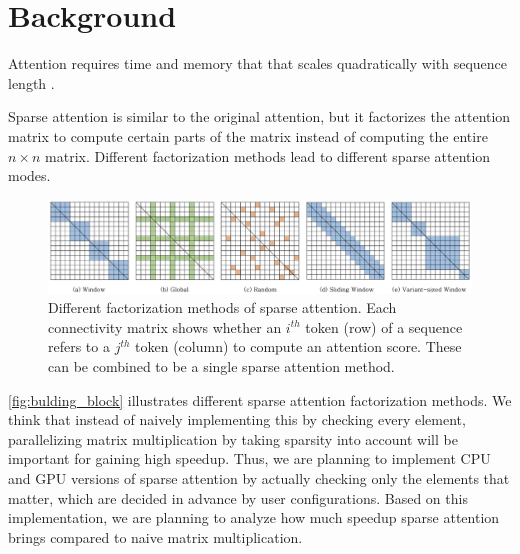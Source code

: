 \documentclass[11pt]{article}
\begin{document}
\section{Background}
Attention requires time and memory that that scales quadratically with sequence length \cite{child2019generating}.

Sparse attention is similar to the original attention, but it factorizes the attention matrix to compute certain parts of the matrix instead of computing the entire $n \times n$ matrix. Different factorization methods lead to different sparse attention modes.

\begin{figure}[h]
  \centering
  \includegraphics[width=170mm]{figures/building_block.png}
  \caption{Different factorization methods of sparse attention.  Each connectivity matrix shows whether an $i^{th}$ token (row) of a sequence refers to a $j^{th}$ token (column) to compute an attention score. These can be combined to be a single sparse attention method.}
 \label{fig:bulding_block}
\end{figure}

\autoref{fig:bulding_block} illustrates different sparse attention factorization methods. 
We think that instead of naively implementing this by checking every element, parallelizing matrix multiplication by taking sparsity into account will be important for gaining high speedup. Thus, we are planning to implement CPU and GPU versions of sparse attention by actually checking only the elements that matter, which are decided in advance by user configurations.
Based on this implementation, we are planning to analyze how much speedup sparse attention brings compared to naive matrix multiplication.

\end{document}
